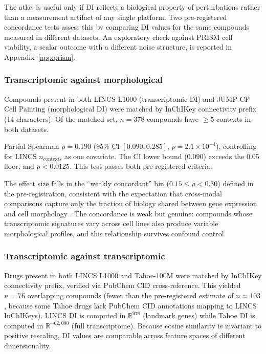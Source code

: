 \documentclass[11pt]{article}
\begin{document}
The atlas is useful only if DI reflects a biological property of
perturbations rather than a measurement artifact of any single platform.
Two pre-registered concordance tests assess this by comparing
DI values for the same compounds measured in different datasets.  An
exploratory check against PRISM cell viability, a scalar outcome with a
different noise structure, is reported in Appendix~\ref{app:prism}.

\subsubsection{Transcriptomic against morphological}

Compounds present in both LINCS L1000 (transcriptomic DI) and JUMP-CP
Cell Painting (morphological DI) were matched by InChIKey connectivity
prefix (14 characters).  Of the matched set, $n = 378$ compounds have
$\geq 5$ contexts in both datasets.

Partial Spearman $\rho = 0.190$ (95\% CI $[0.090, 0.285]$,
$p = 2.1 \times 10^{-4}$), controlling for LINCS $n_{\mathrm{contexts}}$
as one covariate.  The CI lower bound (0.090) exceeds the 0.05 floor,
and $p < 0.0125$.  This test passes both pre-registered criteria.

The effect size falls in the ``weakly concordant'' bin
($0.15 \leq \rho < 0.30$) defined in the pre-registration, consistent
with the expectation that cross-modal comparisons capture only the
fraction of biology shared between gene expression and cell morphology
\citep{haghighi2022crossmodal}.  The concordance is weak but genuine:
compounds whose transcriptomic signatures vary across cell lines also
produce variable morphological profiles, and this relationship survives
confound control.

\subsubsection{Transcriptomic against transcriptomic}

Drugs present in both LINCS L1000 and Tahoe-100M were matched by
InChIKey connectivity prefix, verified via PubChem CID cross-reference.
This yielded $n = 76$ overlapping compounds (fewer than the
pre-registered estimate of $n \approx 103$, because some Tahoe drugs
lack PubChem CID annotations mapping to LINCS InChIKeys).  LINCS DI is
computed in $\mathbb{R}^{978}$ (landmark genes) while Tahoe DI is
computed in $\mathbb{R}^{\sim 62{,}000}$ (full transcriptome).  Because
cosine similarity is invariant to positive rescaling, DI values are
comparable across feature spaces of different dimensionality.
\end{document}
